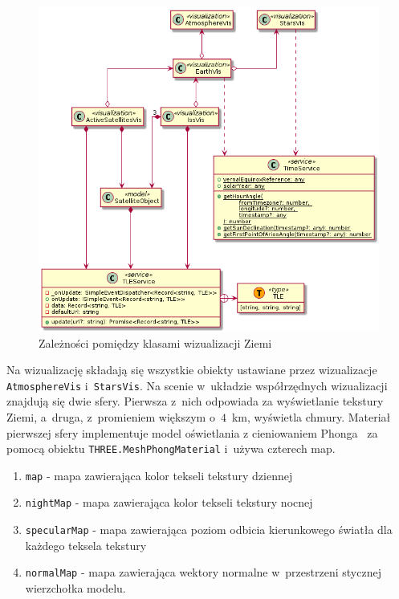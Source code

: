\begin{figure}
  \centering
  \includegraphics[width=\textwidth]{diagrams/out/c4_earthVis.png}
  \caption{Zależności pomiędzy klasami wizualizacji Ziemi}
  \label{fig:c4_earthVis} 
\end{figure}

Na wizualizację składają się wszystkie obiekty ustawiane przez wizualizacje \texttt{AtmosphereVis} i~\texttt{StarsVis}. Na scenie w~układzie współrzędnych wizualizacji znajdują się dwie sfery. Pierwsza z~nich odpowiada za wyświetlanie tekstury Ziemi, a~druga, z~promieniem większym o~$4$~km, wyświetla chmury. Materiał pierwszej sfery implementuje model oświetlania z cieniowaniem Phonga~\cite[Rozdział 3]{RealTime3DGraphics} za pomocą obiektu \texttt{THREE.MeshPhongMaterial} i~używa czterech map.
\begin{enumerate}
  \item \texttt{map} - mapa zawierająca kolor tekseli tekstury dziennej
  \item \texttt{nightMap} - mapa zawierająca kolor tekseli tekstury nocnej
  \item \texttt{specularMap} - mapa zawierająca poziom odbicia kierunkowego światła dla każdego teksela tekstury
  \item \texttt{normalMap} - mapa zawierająca wektory normalne w~przestrzeni stycznej wierzchołka modelu.
\end{enumerate}

